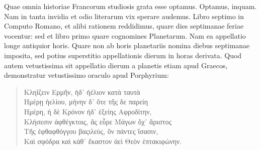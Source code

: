 Quae omnia historiae Francorum studiosis grata esse optamus.
Optamus, inquam.
Nam in tanta invidia et odio literarum
vix sperare audemus.
Libro septimo in Computo Romano, et alibi
rationem reddidimus, quare dies septimanae feriae vocentur: sed
et libro primo quare cognomines Planetarum.
Nam ea appellatio longe antiquior horis.
Quare non ab horis planetariis nomina diebus
septimanae imposita, sed potius superstitio appellationis dierum
in horas derivata.
Quod autem vetustissima sit appellatio dierum
a planetis etiam apud Graecos, demonstratur vetustissimo oraculo
apud Porphyrium:
%
%
%
\begin{verse}
 \textgreek{Κληΐζειν Ερμῆν, ἠδ᾿ ἠέλιον κατὰ ταυτὰ}\\
 \textgreek{Ημέρῃ ἠελίου, μήνην δ᾿ ὅτε τῆς δε παρείη}\\
 \textgreek{Ημέρη, ἠ δὲ Κρόνον ἠδ᾿ ἑξείης Αφροδίτην},\\
%
 \textgreek{Κλήσεσιν ἀφθέγκτοις, ἃς εὗρε Μάγων ὄχ᾽ ἄριστος}\\
%
%
 \textgreek{Τῆς ἑφθαφθόγγου βαςιλεὺς, ὃν πάντες ἴσασιν,}\\
%
 \textgreek{Καὶ σφόδρα καὶ κάθ᾿ ἕκαστον ἀεὶ Θεὸν ἑπτακιφώνην.}
\end{verse}
